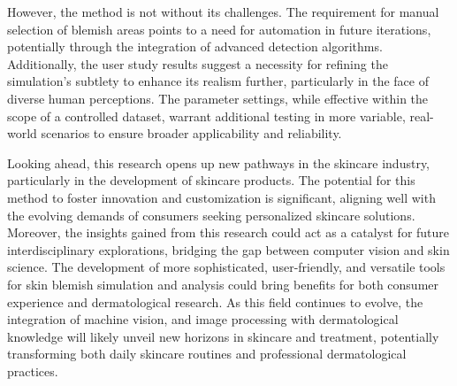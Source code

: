 \begin{spacing}{1.5}
However, the method is not without its challenges. The requirement for manual selection of blemish areas points to a need for automation in future iterations, potentially through the integration of advanced detection algorithms. Additionally, the user study results suggest a necessity for refining the simulation's subtlety to enhance its realism further, particularly in the face of diverse human perceptions. The parameter settings, while effective within the scope of a controlled dataset, warrant additional testing in more variable, real-world scenarios to ensure broader applicability and reliability.

Looking ahead, this research opens up new pathways in the skincare industry, particularly in the development of skincare products. The potential for this method to foster innovation and customization is significant, aligning well with the evolving demands of consumers seeking personalized skincare solutions. Moreover, the insights gained from this research could act as a catalyst for future interdisciplinary explorations, bridging the gap between computer vision and skin science. The development of more sophisticated, user-friendly, and versatile tools for skin blemish simulation and analysis could bring benefits for both consumer experience and dermatological research. As this field continues to evolve, the integration of machine vision, and image processing with dermatological knowledge will likely unveil new horizons in skincare and treatment, potentially transforming both daily skincare routines and professional dermatological practices.

\end{spacing}
    
\newpage

